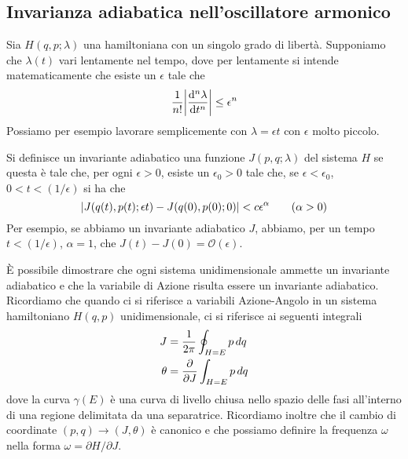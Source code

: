 \documentclass[10pt,a4paper]{article}
\begin{document}
\subsection{Invarianza adiabatica nell'oscillatore armonico}
Sia \(H(q,p;\lambda)\) una hamiltoniana con un singolo grado di libertà. Supponiamo che \(\lambda(t)\) vari lentamente nel tempo, dove per lentamente si intende matematicamente che esiste un \(\epsilon\) tale che
\begin{equation}
	\frac{1}{n!}\abs{\dv[n]{\lambda}{t}} \leq \epsilon^n
\end{equation}
Possiamo per esempio lavorare semplicemente con \(\lambda = \epsilon t\) con \(\epsilon\) molto piccolo.

Si definisce un invariante adiabatico una funzione \(J(p,q;\lambda)\) del sistema \(H\) se questa è tale che, per ogni \(\epsilon > 0\), esiste un \(\epsilon_0>0\) tale che, se \(\epsilon < \epsilon_0\), \(0<t<(1/\epsilon)\) si ha che
\begin{equation}
	\abs{J(q(t),p(t);\epsilon t) - J(q(0), p(0);0)}<c\epsilon^\alpha \quad\quad (\alpha > 0)
\end{equation}
Per esempio, se abbiamo un invariante adiabatico \(J\), abbiamo, per un tempo \(t<(1/\epsilon)\), \(\alpha=1\), che \(J(t)-J(0) = \mathcal{O}(\epsilon)\).

È possibile dimostrare che ogni sistema unidimensionale ammette un invariante adiabatico e che la variabile di Azione risulta essere un invariante adiabatico. Ricordiamo che quando ci si riferisce a variabili Azione-Angolo in un sistema hamiltoniano \(H(q,p)\) unidimensionale, ci si riferisce ai seguenti integrali
\begin{align}
	J &= \frac{1}{2\pi} \oint_{H=E} p\,dq \\
	\theta &= \pdv{}{J} \int_{H=E} p\,dq
\end{align}
dove la curva \(\gamma(E)\) è una curva di livello chiusa nello spazio delle fasi all'interno di una regione delimitata da una separatrice. Ricordiamo inoltre che il cambio di coordinate \((p,q)\to(J,\theta)\) è canonico e che possiamo definire la frequenza \(\omega\) nella forma \(\omega = \partial H / \partial J\).
\end{document}
